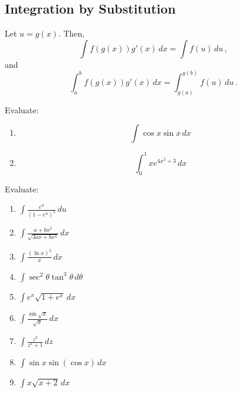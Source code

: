 \documentclass[12pt]{amsart}
\begin{document}
\subsection*{Integration by Substitution}
Let $u = g(x)$. Then,
\begin{equation*}
	\int f(g(x)) g'(x) \, dx = \int f(u) \, du \,,
\end{equation*}
and
\begin{equation*}
	\int_a^b f(g(x)) g'(x) \, dx = \int_{g(a)}^{g(b)} f(u) \, du \,.
\end{equation*}

\begin{example}
	Evaluate:
	\begin{enumerate}
		\item
		      \begin{equation*}
			      \int \cos x \sin x \, dx
		      \end{equation*}
		      \vspace{5cm}
		\item
		      \begin{equation*}
			      \int_0^1 x e^{4x^2 + 3} \, dx
		      \end{equation*}
		      \vspace{5cm}

	\end{enumerate}
\end{example}

\begin{problem}
Evaluate:
\begin{enumerate}
	\item \( \displaystyle \int \frac{e^u}{(1 - e^u)^2} \, du \)
	      \vspace{5cm}
	\item \( \displaystyle \int \frac{a + bx^2}{\sqrt{3ax + bx^3}} \, dx \)
	      \vspace{5cm}
	\item \( \displaystyle \int \frac{(\ln x)^2}{x} \, dx \)
	      \vspace{5cm}
	\item \( \displaystyle \int \sec^2 \theta \tan^3 \theta \, d\theta \)
	      \vspace{5cm}
	\item \( \displaystyle \int e^x \sqrt{1 + e^x} \, dx \)
	      \vspace{5cm}
	\item \( \displaystyle \int \frac{\sin \sqrt{x}}{\sqrt{x}} \, dx \)
	      \vspace{5cm}
	\item \( \displaystyle \int \frac{z^2}{z^3 + 1} \, dz \)
	      \vspace{5cm}
	\item \( \displaystyle \int \sin x \sin(\cos x) \, dx \)
	      \vspace{5cm}
	\item \( \displaystyle \int x \sqrt{x + 2} \, dx \)
	      \vspace{5cm}
\end{enumerate}
\end{problem}
\end{document}
